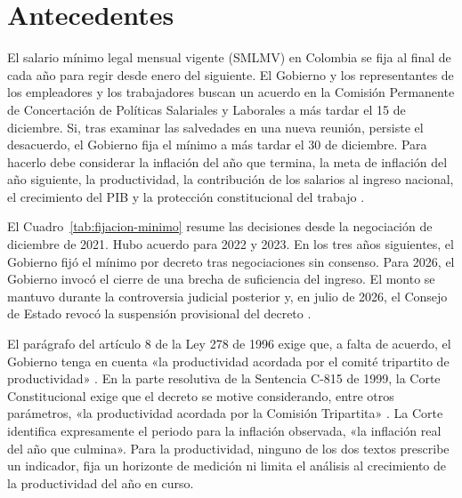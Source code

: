 


\section{Antecedentes}
\label{sec:antecedentes}

El salario mínimo legal mensual vigente (SMLMV) en Colombia se fija al final de cada año para regir desde enero del siguiente. El Gobierno y los representantes de los empleadores y los trabajadores buscan un acuerdo en la Comisión Permanente de Concertación de Políticas Salariales y Laborales a más tardar el 15 de diciembre. Si, tras examinar las salvedades en una nueva reunión, persiste el desacuerdo, el Gobierno fija el mínimo a más tardar el 30 de diciembre. Para hacerlo debe considerar la inflación del año que termina, la meta de inflación del año siguiente, la productividad, la contribución de los salarios al ingreso nacional, el crecimiento del PIB y la protección constitucional del trabajo \citep{ley278,c815}.


El Cuadro~\ref{tab:fijacion-minimo} resume las decisiones desde la negociación de diciembre de 2021. Hubo acuerdo para 2022 y 2023. En los tres años siguientes, el Gobierno fijó el mínimo por decreto tras negociaciones sin consenso. Para 2026, el Gobierno invocó el cierre de una brecha de suficiencia del ingreso. El monto se mantuvo durante la controversia judicial posterior y, en julio de 2026, el Consejo de Estado revocó la suspensión provisional del decreto \citep{decreto1469,ce2026}.




El parágrafo del artículo 8 de la Ley 278 de 1996 exige que, a falta de acuerdo, el Gobierno tenga en cuenta «la productividad acordada por el comité tripartito de productividad» \citep{ley278}. En la parte resolutiva de la Sentencia C-815 de 1999, la Corte Constitucional exige que el decreto se motive considerando, entre otros parámetros, «la productividad acordada por la Comisión Tripartita» \citep{c815}. La Corte identifica expresamente el periodo para la inflación observada, «la inflación real del año que culmina». Para la productividad, ninguno de los dos textos prescribe un indicador, fija un horizonte de medición ni limita el análisis al crecimiento de la productividad del año en curso.

